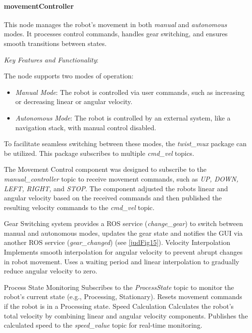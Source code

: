 \documentclass[../../main]{subfiles}
\begin{document}
\paragraph{movementController}

This node manages the robot's movement in both \emph{manual} and
\emph{autonomous} modes. It processes control commands, handles gear
switching, and ensures smooth transitions between states.

\emph{Key Features and Functionality}:

The node supports two modes of operation:

\begin{itemize}
\item
  \emph{Manual Mode}: The robot is controlled via user commands, such as
  increasing or decreasing linear or angular velocity.
\item
  \emph{Autonomous Mode}: The robot is controlled by an external system,
  like a navigation stack, with manual control disabled.
\end{itemize}

To facilitate seamless switching between these modes, the
\emph{twist\_mux} package can be utilized. This package subscribes to
multiple \emph{cmd\_vel} topics.

The Movement Control component was designed to subscribe to the
\emph{manual\_controller} topic to receive movement commands, such as
\emph{UP, DOWN, LEFT, RIGHT,} and \emph{STOP}. The component adjusted
the robot\textquotesingle s linear and angular velocity based on the
received commands and then published the resulting velocity commands to
the \emph{cmd\_vel} topic.

Gear Switching system provides a ROS service (\emph{change\_gear}) to
switch between manual and autonomous modes, updates the gear state and
notifies the GUI via another ROS service (\emph{gear\_changed}) (see
\cref{judFig15}). Velocity Interpolation Implements smooth interpolation for
angular velocity to prevent abrupt changes in robot movement. Uses a
waiting period and linear interpolation to gradually reduce angular
velocity to zero.

Process State Monitoring Subscribes to the \emph{ProcessState} topic to
monitor the robot's current state (e.g., Processing, Stationary). Resets
movement commands if the robot is in a Processing state. Speed
Calculation Calculates the robot's total velocity by combining linear
and angular velocity components. Publishes the calculated speed to the
\emph{speed\_value} topic for real-time monitoring.
\end{document}
